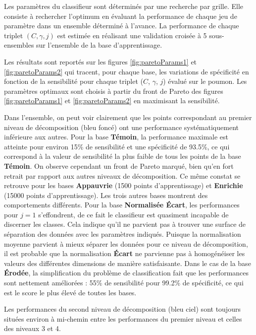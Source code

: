 Les paramètres du classifieur sont déterminés par une recherche par grille. Elle consiste à rechercher l'optimum en évaluant la performance de chaque jeu de paramètre dans un ensemble déterminé à l'avance. La performance de chaque triplet $(C, \gamma, j)$ est estimée en réalisant une validation croisée à 5 sous-ensembles sur l'ensemble de la base d'apprentissage. 


Les résultats sont reportés sur les figures \ref{fig:paretoParams1} et \ref{fig:paretoParams2} qui tracent, pour chaque base, les variations de spécificité en fonction de la sensibilité pour chaque triplet ($C$, $\gamma$, $j$) évalué sur le poumon. Les paramètres optimaux sont choisis à partir du front de Pareto des figures \ref{fig:paretoParams1} et \ref{fig:paretoParams2} en maximisant la sensibilité.

Dans l'ensemble, on peut voir clairement que les points correspondant au premier niveau de décomposition (bleu foncé) ont une performance systématiquement inférieure aux autres. Pour la base \textbf{Témoin}, la performance maximale est atteinte pour environ 15\% de sensibilité et une spécificité de 93.5\%, ce qui correspond à la valeur de sensibilité la plus faible de tous les points de la base \textbf{Témoin}. On observe cependant un front de Pareto marqué, bien qu'en fort retrait par rapport aux autres niveaux de décomposition. Ce même constat se retrouve pour les bases \textbf{Appauvrie} (1500 points d’apprentissage) et \textbf{Enrichie} (15000 points d’apprentissage). Les trois autres bases montrent des comportements différents. Pour la base \textbf{Normalisée \'Ecart}, les performances pour $j=1$ s'effondrent, de ce fait le classifieur est quasiment incapable de discerner les classes. Cela indique qu'il ne parvient pas à trouver une surface de séparation des données avec les paramètres indiqués. Puisque la normalisation moyenne parvient à mieux séparer les données pour ce niveau de décomposition, il est probable que la normalisation \textbf{\'Ecart} ne parvienne pas à homogénéiser les valeurs des différentes dimensions de manière satisfaisante. Dans le cas de la base \textbf{Érodée}, la simplification du problème de classification fait que les performances sont nettement améliorées : 55\% de sensibilité pour 99.2\% de spécificité, ce qui est le score le plus élevé de toutes les bases. 

Les performances du second niveau de décomposition (bleu ciel) sont toujours situées environ à mi-chemin entre les performances du premier niveau et celles des niveaux 3 et 4.

